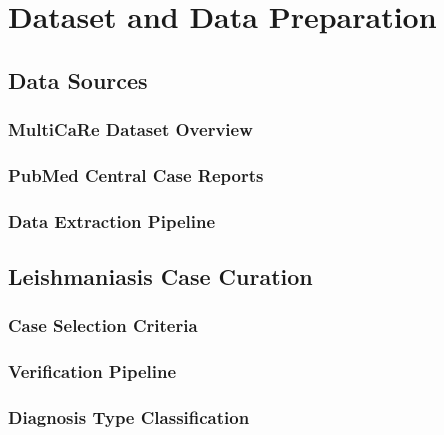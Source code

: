 \chapter{Dataset and Data Preparation}
\label{ch:dataset}

%
%
\section{Data Sources}
\label{sec:dataset:sources}

\subsection{MultiCaRe Dataset Overview}
\label{subsec:dataset:sources:multicare}

\subsection{PubMed Central Case Reports}
\label{subsec:dataset:sources:pmc}

\subsection{Data Extraction Pipeline}
\label{subsec:dataset:sources:extraction}

%
%
\section{Leishmaniasis Case Curation}
\label{sec:dataset:curation}

\subsection{Case Selection Criteria}
\label{subsec:dataset:curation:criteria}

\subsection{Verification Pipeline}
\label{subsec:dataset:curation:verification}

\subsection{Diagnosis Type Classification}
\label{subsec:dataset:curation:diagnosis}

